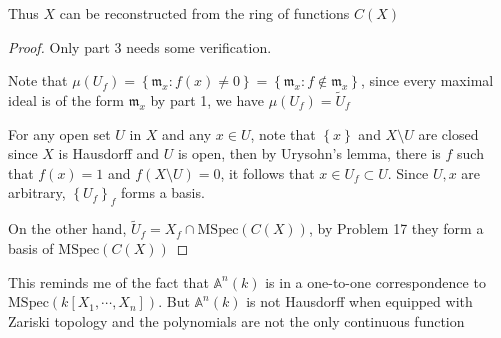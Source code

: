 \documentclass{solution}
\begin{document}
\begin{problem}
    Thus $X$ can be reconstructed from the ring of functions $C(X)$
\end{problem}

\begin{proof}
    Only part 3 needs some verification.

    Note that $\mu(U_f) = \left\lbrace \mathfrak{m}_x: f(x) \ne 0 \right\rbrace = \left\lbrace \mathfrak{m}_x: f \notin \mathfrak{m}_x \right\rbrace$, since every maximal ideal is of the form $\mathfrak{m}_x$ by part 1, we have $\mu(U_f) = \tilde{U}_f$

    For any open set $U$ in $X$ and any $x \in U$, note that $\left\lbrace x \right\rbrace$ and $X \setminus U$ are closed since $X$ is Hausdorff and $U$ is open, then by Urysohn's lemma, there is $f$ such that $f(x) = 1$ and $f(X \setminus U) = 0$, it follows that $x \in U_f \subset U$. Since $U, x$ are arbitrary, $\left\lbrace U_f \right\rbrace_f$ forms a basis.

    On the other hand, $\tilde{U}_f = X_f \cap \mathrm{MSpec}(C(X))$, by Problem 17 they form a basis of $\mathrm{MSpec}(C(X))$
\end{proof}

{\color{red} This reminds me of the fact that $\mathbb{A}^n(k)$ is in a one-to-one correspondence to $\mathrm{MSpec}(k[X_1, \cdots, X_n])$. But $\mathbb{A}^n(k)$ is not Hausdorff when equipped with Zariski topology and the polynomials are not the only continuous function}
\end{document}
